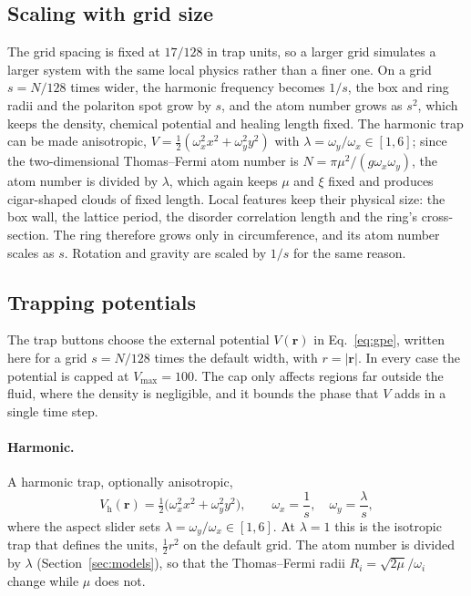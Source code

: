 \documentclass[11pt,a4paper]{article}
\begin{document}
\subsection{Scaling with grid size}

The grid spacing is fixed at $17/128$ in trap units, so a larger grid simulates a larger system with the same local physics rather than a finer one. On a grid $s=N/128$ times wider, the harmonic frequency becomes $1/s$, the box and ring radii and the polariton spot grow by $s$, and the atom number grows as $s^2$, which keeps the density, chemical potential and healing length fixed. The harmonic trap can be made anisotropic, $V=\tfrac12(\omega_x^2x^2+\omega_y^2y^2)$ with $\lambda=\omega_y/\omega_x\in[1,6]$; since the two-dimensional Thomas--Fermi atom number is $N=\pi\mu^2/(g\omega_x\omega_y)$, the atom number is divided by $\lambda$, which again keeps $\mu$ and $\xi$ fixed and produces cigar-shaped clouds of fixed length. Local features keep their physical size: the box wall, the lattice period, the disorder correlation length and the ring's cross-section. The ring therefore grows only in circumference, and its atom number scales as $s$. Rotation and gravity are scaled by $1/s$ for the same reason.

\subsection{Trapping potentials}
\label{sec:traps}

The trap buttons choose the external potential $V(\mathbf r)$ in Eq.~\eqref{eq:gpe}, written here for a grid $s=N/128$ times the default width, with $r=|\mathbf r|$. In every case the potential is capped at $V_{\max}=100$. The cap only affects regions far outside the fluid, where the density is negligible, and it bounds the phase that $V$ adds in a single time step.

\paragraph{Harmonic.} A harmonic trap, optionally anisotropic,
\begin{equation}
V_{\mathrm{h}}(\mathbf r)=\tfrac12\bigl(\omega_x^2x^2+\omega_y^2y^2\bigr),\qquad \omega_x=\frac{1}{s},\quad \omega_y=\frac{\lambda}{s},
\end{equation}
where the aspect slider sets $\lambda=\omega_y/\omega_x\in[1,6]$. At $\lambda=1$ this is the isotropic trap that defines the units, $\tfrac12r^2$ on the default grid. The atom number is divided by $\lambda$ (Section~\ref{sec:models}), so that the Thomas--Fermi radii $R_i=\sqrt{2\mu}/\omega_i$ change while $\mu$ does not.
\end{document}
